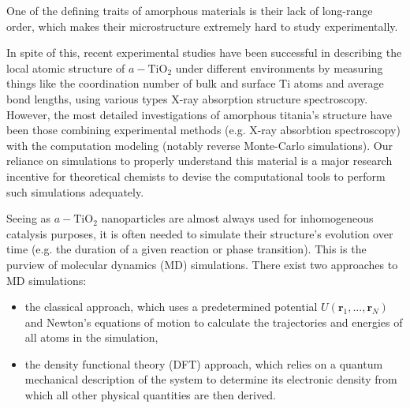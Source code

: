 \documentclass[aps,prb,twocolumn,amsmath,amssymb,superscriptaddress,longbibliography]{revtex4-1}
\newcommand\tab[1][1cm]{\hspace*{#1}} %
\begin{document}
\tab One of the defining traits of amorphous materials is their lack of long-range order, which makes their microstructure extremely hard to study experimentally.

In spite of this, recent experimental studies have been successful in describing the local atomic structure of $a-\text{TiO}_2$ under different environments\cite{exptl1,exptl2,exptl3} by measuring things like the coordination number of bulk and surface Ti atoms and average bond lengths, using various types X-ray absorption structure spectroscopy.
However, the most detailed investigations of amorphous titania's structure have been those combining experimental methods (e.g. X-ray absorbtion spectroscopy) with the computation modeling (notably reverse Monte-Carlo simulations)\cite{comp_exptl1,comp_exptl2,comp_exptl3}.
Our reliance on simulations to properly understand this material is a major research incentive for theoretical chemists to devise the computational tools to perform such simulations adequately.

\tab Seeing as $a-\text{TiO}_2$ nanoparticles are almost always used for inhomogeneous catalysis purposes, it is often needed to simulate their structure's evolution over time (e.g. the duration of a given reaction or phase transition).
This is the purview of molecular dynamics (MD) simulations.
There exist two approaches to MD simulations:

\begin{itemize}
\item the classical approach, which uses a predetermined potential ${U(\textbf{r}_1,...,\textbf{r}_N)}$ and Newton's equations of motion to calculate the trajectories and energies of all atoms in the simulation,
\item the density functional theory (DFT) approach, which relies on a quantum mechanical description of the system to determine its electronic density from which all other physical quantities are then derived.
\end{itemize}
\end{document}
